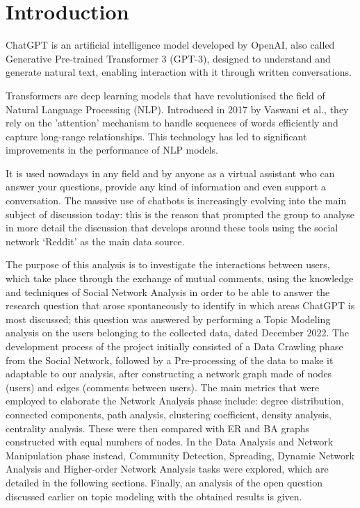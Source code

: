 \documentclass[sigchi]{acmart}
\begin{document}
\section{Introduction}
  ChatGPT is an artificial intelligence model developed by OpenAI, also called Generative Pre-trained Transformer 3 (GPT-3), designed to understand and generate natural text, enabling interaction with it through written conversations. 

  Transformers are deep learning models that have revolutionised the field of Natural Language Processing (NLP). Introduced in 2017 by Vaswani et al.\cite{vaswani2017attention}, they rely on the 'attention' mechanism to handle sequences of words efficiently and capture long-range relationships. This technology has led to significant improvements in the performance of NLP models. 
  
  It is used nowadays in any field and by anyone as a virtual assistant who can answer your questions, provide any kind of information and even support a conversation. The massive use of chatbots is increasingly evolving into the main subject of discussion today: this is the reason that prompted the group to analyse in more detail the discussion that develops around these tools using the social network `Reddit' \cite{reddit} as the main data source. 
  
  The purpose of this analysis is to investigate the interactions between users, which take place through the exchange of mutual comments, using the knowledge and techniques of Social Network Analysis in order to be able to answer the research question that arose spontaneously to identify in which areas ChatGPT is most discussed; this question was answered by performing a Topic Modeling analysis on the users belonging to the collected data, dated December 2022. The development process of the project initially consisted of a Data Crawling phase from the Social Network, followed by a Pre-processing of the data to make it adaptable to our analysis, after constructing a network graph made of nodes (users) and edges (comments between users). The main metrics that were employed to elaborate the Network Analysis phase include: degree distribution, connected components, path analysis, clustering coefficient, density analysis, centrality analysis. These were then compared with ER and BA graphs constructed with equal numbers of nodes. In the Data Analysis and Network Manipulation phase instead, Community Detection, Spreading, Dynamic Network Analysis and Higher-order Network Analysis tasks were explored, which are detailed in the following sections. Finally, an analysis of the open question discussed earlier on topic modeling with the obtained results is given.
  
\end{document}
